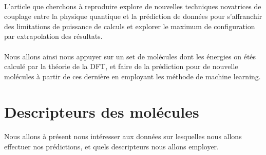 \documentclass[a4paper,12pt,titlepage]{report}
\begin{document}
\paragraph{}
L'article que cherchons à reproduire explore de nouvelles techniques novatrices de couplage entre la physique quantique et la prédiction de données pour s'affranchir des limitations de puissance de calculs et explorer le maximum de configuration par extrapolation des résultats. \\
\paragraph{}
Nous allons ainsi nous appuyer sur un set de molécules dont les énergies on étés calculé par la théorie de la DFT, et faire de la prédiction pour de nouvelle molécules à partir de ces dernière en employant les méthode de machine learning.

\newpage
\section{Descripteurs des molécules}

\paragraph{}
Nous allons à présent nous intéresser aux données sur lesquelles nous allons effectuer nos prédictions, et quels descripteurs nous allons employer.
\end{document}
